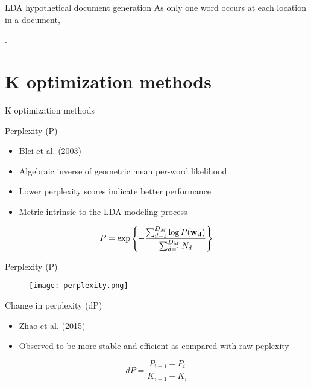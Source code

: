\documentclass{beamer}
\begin{document}
\begin{frame}{LDA hypothetical document generation}
As only one word occurs at each location in a document, 
    \vspace{0.2cm}
\begin{center}
{\mbox{}}.
\end{center}
\end{frame}



\section{K optimization methods}
\begin{frame}{K optimization methods}
\end{frame}


\begin{frame}{Perplexity (P)}
 
\begin{itemize}
\item Blei et al. (2003)
\item Algebraic inverse of geometric mean per-word  likelihood
\item Lower perplexity scores indicate better performance
\item Metric intrinsic to the LDA modeling process
\end{itemize}

$$	
P = \exp \left\{ -\frac{\sum_{d=1}^{D_M} \log P({\bf w_d})}{\sum_{d=1}^{D_M} N_d} \right\}
$$
\end{frame}



\begin{frame}{Perplexity (P)}
\begin{figure}[htb!]
\texttt{[image: perplexity.png]}
\end{figure}
\end{frame}


\begin{frame}{Change in perplexity (dP)}
\begin{itemize}
\item Zhao et al. (2015)
\item Observed to be more stable and efficient as compared with raw peplexity
\end{itemize}


$$
dP = \frac{ P_{i+1} - P_{i}}{K_{i+1} - K_{i}}
$$
\end{frame}
\end{document}
